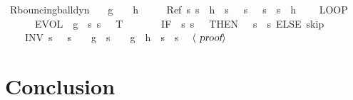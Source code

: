 \documentclass[envcountsame]{llncs}
\begin{document}
\begin{example}
\begin{isabellebody}
\isanewline
{}\isamarkupfalse%
\ R{\isacharunderscore}bouncing{\isacharunderscore}ball{\isacharunderscore}dyn{\isacharcolon}\isanewline
\ \ \ {\isachardoublequoteopen}g\ {\isacharless}\ {}{\isachardoublequoteclose}\ \ {\isachardoublequoteopen}h\ {\isasymge}\ {}{\isachardoublequoteclose}\isanewline
\ \ \ {\isachardoublequoteopen}Ref\ {\isasymlceil}{\isasymlambda}s{\isachardot}\ s{\isachardollar}{}\ {\isacharequal}\ h\ {\isasymand}\ s{\isachardollar}{}\ {\isacharequal}\ {}{\isasymrceil}\ {\isasymlceil}{\isasymlambda}s{\isachardot}\ {}\ {\isasymle}\ s{\isachardollar}{}\ {\isasymand}\ s{\isachardollar}{}\ {\isasymle}\ h{\isasymrceil}\ {\isasymge}\ \isanewline
\ \ {\isacharparenleft}LOOP\ \isanewline
\ \ \ \ \ \ {\isacharparenleft}{\isacharparenleft}EVOL\ {\isacharparenleft}{\isasymphi}\ g{\isacharparenright}\ {\isacharparenleft}{\isasymlambda}\ s{\isachardot}\ s{\isachardollar}{}\ {\isasymge}\ {}{\isacharparenright}\ T{\isacharparenright}{\isacharsemicolon}\isanewline
\ \ \ \ \ \ \ {\isacharparenleft}IF\ {\isacharparenleft}{\isasymlambda}\ s{\isachardot}\ s{\isachardollar}{}\ {\isacharequal}\ {}{\isacharparenright}\ THEN\ {\isacharparenleft}{}\ {\isacharcolon}{\isacharcolon}{\isacharequal}\ {\isacharparenleft}{\isasymlambda}s{\isachardot}\ {\isacharminus}\ s{\isachardollar}{}{\isacharparenright}{\isacharparenright}\ ELSE\ skip{\isacharparenright}{\isacharparenright}\ \isanewline
\ \ \ \ INV\ {\isacharparenleft}{\isasymlambda}s{\isachardot}\ {}\ {\isasymle}\ s{\isachardollar}{}\ {\isasymand}\ {}\ {\isasymcdot}\ g\ {\isasymcdot}\ s{\isachardollar}{}\ {\isacharequal}\ {}\ {\isasymcdot}\ g\ {\isasymcdot}\ h\ {\isacharplus}\ s{\isachardollar}{}\ {\isasymcdot}\ s{\isachardollar}{}{\isacharparenright}{\isacharparenright}{\isachardoublequoteclose}\isanewline
\ \ $\langle \isa{proof}\rangle$\isanewline
\end{isabellebody}

\end{example}




\section{Conclusion}\label{sec:conclusion}
\end{document}
